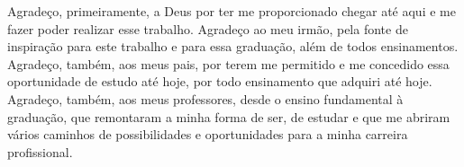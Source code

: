 Agradeço, primeiramente, a Deus por ter me proporcionado chegar até aqui e me fazer poder realizar esse trabalho. Agradeço ao meu irmão, pela fonte de inspiração para este trabalho e para essa graduação, além de todos ensinamentos. Agradeço, também, aos meus pais, por terem me permitido e me concedido essa oportunidade de estudo até hoje, por todo ensinamento que adquiri até hoje. Agradeço, também, aos meus professores, desde o ensino fundamental à graduação, que remontaram a minha forma de ser, de estudar e que me abriram vários caminhos de possibilidades e oportunidades para a minha carreira profissional.